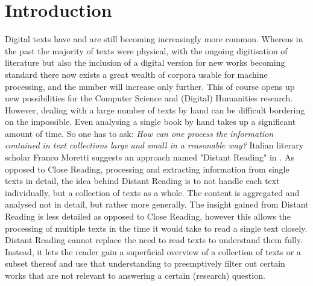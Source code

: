 \chapter{Introduction}
Digital texts have and are still becoming increasingly more common. Whereas in the past the majority of texts were physical, with the ongoing digitisation of literature but also the inclusion of a digital version for new works becoming standard there now exists a great wealth of corpora usable for machine processing, and the number will increase only further. This of course opens up new possibilities for the Computer Science and (Digital) Humanities research. However, dealing with a large number of texts by hand can be difficult bordering on the impossible. Even analysing a single book by hand takes up a significant amount of time. So one has to ask: \textit{How can one process the information contained in text collections large and small in a reasonable way?} Italian literary scholar Franco Moretti suggests an approach named "Distant Reading" in  \cite{moretti13}. As opposed to Close Reading, processing and extracting information from single texts in detail, the idea behind Distant Reading is to not handle each text individually, but a collection of texts as a whole. The content is aggregated and analysed not in detail, but rather more generally. The insight gained from Distant Reading is less detailed as opposed to Close Reading, however this allows the processing of multiple texts in the time it would take to read a single text closely. Distant Reading cannot replace the need to read texts to understand them fully. Instead, it lets the reader gain a superficial overview of a collection of texts or a subset thereof and use that understanding to preemptively filter out certain works that are not relevant to answering a certain (research) question.

